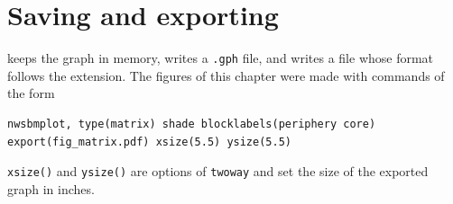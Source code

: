 \section{Saving and exporting}
 keeps the graph in memory,  writes a \texttt{.gph} file, and  writes a file whose format follows the extension. The figures of this chapter were made with commands of the form
\begin{lstlisting}
nwsbmplot, type(matrix) shade blocklabels(periphery core) export(fig_matrix.pdf) xsize(5.5) ysize(5.5)
\end{lstlisting}
\texttt{xsize()} and \texttt{ysize()} are options of \texttt{twoway} and set the size of the exported graph in inches.
